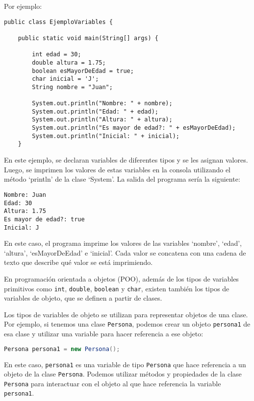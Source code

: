 \documentclass{article}
\begin{document}
Por ejemplo:
\begin{lstlisting}
public class EjemploVariables {

    public static void main(String[] args) {

        int edad = 30;
        double altura = 1.75;
        boolean esMayorDeEdad = true;
        char inicial = 'J';
        String nombre = "Juan";

        System.out.println("Nombre: " + nombre);
        System.out.println("Edad: " + edad);
        System.out.println("Altura: " + altura);
        System.out.println("Es mayor de edad?: " + esMayorDeEdad);
        System.out.println("Inicial: " + inicial);
    }
\end{lstlisting}

En este ejemplo, se declaran variables de diferentes tipos y se les asignan valores. Luego, se imprimen los valores de estas variables en la consola utilizando el método \enquote*{println} de la clase \enquote*{System}. La salida del programa sería la siguiente:
\begin{lstlisting}[numbers=none]
Nombre: Juan
Edad: 30
Altura: 1.75
Es mayor de edad?: true
Inicial: J
\end{lstlisting}
En este caso, el programa imprime los valores de las variables \enquote*{nombre}, \enquote*{edad}, \enquote*{altura}, \enquote*{esMayorDeEdad} e \enquote*{inicial}. Cada valor se concatena con una cadena de texto que describe qué valor se está imprimiendo.

En programación orientada a objetos (POO), además de los tipos de variables primitivos como \lstinline{int}, \lstinline{double}, \lstinline{boolean} y \lstinline{char}, existen también los tipos de variables de objeto, que se definen a partir de clases.

Los tipos de variables de objeto se utilizan para representar objetos de una clase. Por ejemplo, si tenemos una clase \lstinline{Persona}, podemos crear un objeto \lstinline{persona1} de esa clase y utilizar una variable para hacer referencia a ese objeto:

\begin{lstlisting}[language=Java]
Persona persona1 = new Persona();
\end{lstlisting}

En este caso, \lstinline{persona1} es una variable de tipo \lstinline{Persona} que hace referencia a un objeto de la clase \lstinline{Persona}. Podemos utilizar métodos y propiedades de la clase \lstinline{Persona} para interactuar con el objeto al que hace referencia la variable \lstinline{persona1}.
\end{document}
